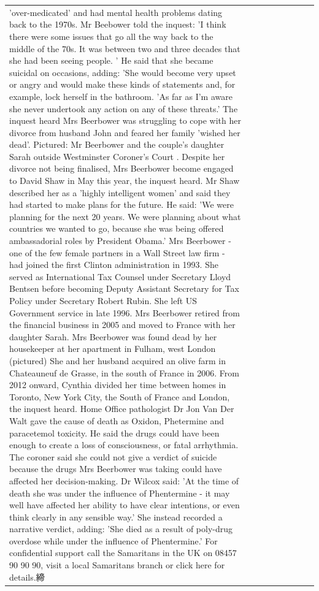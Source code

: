 \begin{table}[H]
\begin{tabular}{lllrlllll}
'over-medicated' and had mental health problems dating back to the 1970s. Mr Beebower told the inquest: 'I think there were some issues that go all the way back to the middle of the 70s. It was between two and three decades that she had been seeing people. ' He said that she became suicidal on occasions, adding: 'She would become very upset or angry and would make these kinds of statements and, for example, lock herself in the bathroom. 'As far as I'm aware she never undertook any action on any of these threats.' The inquest heard Mrs Beerbower was struggling to cope with her divorce from husband John and feared her family 'wished her dead'. Pictured: Mr Beerbower and the couple's daughter Sarah outside Westminster Coroner's Court . Despite her divorce not being finalised, Mrs Beerbower become engaged to David Shaw in May this year, the inquest heard. Mr Shaw described her as a 'highly intelligent women' and said they had started to make plans for the future. He said: 'We were planning for the next 20 years. We were planning about what countries we wanted to go, because she was being offered ambassadorial roles by President Obama.' Mrs Beerbower - one of the few female partners in a Wall Street law firm - had joined the first Clinton administration in 1993. She served as International Tax Counsel under Secretary Lloyd Bentsen before becoming Deputy Assistant Secretary for Tax Policy under Secretary Robert Rubin. She left US Government service in late 1996. Mrs Beerbower retired from the financial business in 2005 and moved to France with her daughter Sarah. Mrs Beerbower was found dead by her housekeeper at her apartment in Fulham, west London (pictured) She and her husband acquired an olive farm in Chateauneuf de Grasse, in the south of France in 2006. From 2012 onward, Cynthia divided her time between homes in Toronto, New York City, the South of France and London, the inquest heard. Home Office pathologist Dr Jon Van Der Walt gave the cause of death as Oxidon, Phetermine and paracetemol toxicity. He said the drugs could have been enough to create a loss of consciousness, or fatal arrhythmia. The coroner said she could not give a verdict of suicide because the drugs Mrs Beerbower was taking could have affected her decision-making. Dr Wilcox said: 'At the time of death she was under the influence of Phentermine - it may well have affected her ability to have clear intentions, or even think clearly in any sensible way.' She instead recorded a narrative verdict, adding: 'She died as a result of poly-drug overdose while under the influence of Phentermine.' For confidential support call the Samaritans in the UK on 08457 90 90 90, visit a local Samaritans branch or click here for details.締 \\

\end{tabular}
\end{table}
